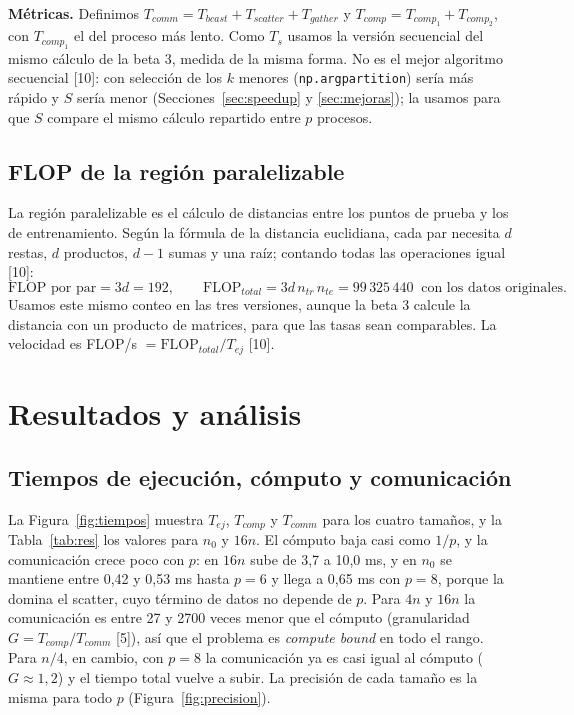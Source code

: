 \documentclass[11pt,a4paper]{article}
\newcommand{\ntr}{n_{tr}}
\newcommand{\nte}{n_{te}}
\begin{document}
\textbf{Métricas.} Definimos $T_{comm} = T_{bcast} + T_{scatter} + T_{gather}$ y $T_{comp} = T_{comp_1} + T_{comp_2}$, con $T_{comp_1}$ el del proceso más lento. Como $T_s$ usamos la versión secuencial del mismo cálculo de la beta 3, medida de la misma forma. No es el mejor algoritmo secuencial [10]: con selección de los $k$ menores (\texttt{np.argpartition}) sería más rápido y $S$ sería menor (Secciones~\ref{sec:speedup} y \ref{sec:mejoras}); la usamos para que $S$ compare el mismo cálculo repartido entre $p$ procesos.

\subsection{FLOP de la región paralelizable}

La región paralelizable es el cálculo de distancias entre los puntos de prueba y los de entrenamiento. Según la fórmula de la distancia euclidiana, cada par necesita $d$ restas, $d$ productos, $d-1$ sumas y una raíz; contando todas las operaciones igual [10]:
\[
\text{FLOP por par} = 3d = 192, \qquad \text{FLOP}_{total} = 3d\,\ntr\,\nte = 99\,325\,440 \ \text{ con los datos originales.}
\]
Usamos este mismo conteo en las tres versiones, aunque la beta 3 calcule la distancia con un producto de matrices, para que las tasas sean comparables. La velocidad es FLOP/s $= \text{FLOP}_{total}/T_{ej}$ [10].

\section{Resultados y análisis}

\subsection{Tiempos de ejecución, cómputo y comunicación}
\label{sec:tiempos}

La Figura~\ref{fig:tiempos} muestra $T_{ej}$, $T_{comp}$ y $T_{comm}$ para los cuatro tamaños, y la Tabla~\ref{tab:res} los valores para $n_0$ y $16n$. El cómputo baja casi como $1/p$, y la comunicación crece poco con $p$: en $16n$ sube de 3,7 a 10,0 ms, y en $n_0$ se mantiene entre 0,42 y 0,53 ms hasta $p = 6$ y llega a 0,65 ms con $p = 8$, porque la domina el scatter, cuyo término de datos no depende de $p$. Para $4n$ y $16n$ la comunicación es entre 27 y 2700 veces menor que el cómputo (granularidad $G = T_{comp}/T_{comm}$ [5]), así que el problema es \textit{compute bound} en todo el rango. Para $n/4$, en cambio, con $p = 8$ la comunicación ya es casi igual al cómputo ($G \approx 1{,}2$) y el tiempo total vuelve a subir. La precisión de cada tamaño es la misma para todo $p$ (Figura~\ref{fig:precision}).
\end{document}
